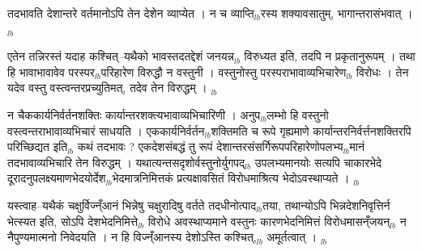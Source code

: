 \documentclass[article,12pt,a4paper]{memoir}%
\newcounter{parCount}
\begin{document}
	  
	  \pstart \leavevmode%
	तदभावति देशान्तरे वर्तमानोऽपि तेन देशेन व्याप्येत । न च व्याप्ति{\tiny $_{lb}$}रस्य शक्यावसातुम्, भागान्तरासंभवात् ।
	{}
	\pend%
      {\tiny $_{lb}$}

	  
	  \pstart \leavevmode%
	एतेन तन्निरस्तं यदाह कश्चित्--यथैको भावस्तदतद्देशं जनयन्न{\tiny $_{lb}$} विरुध्यत इति, तदपि न प्रकृतानुरूपम् । तथा हि भावाभावावेव परस्पर{\tiny $_{lb}$}परिहारेण विरुद्धौ न वस्तुनी । वस्तुनोस्तु परस्पराभावाव्यभिचारेण{\tiny $_{lb}$} विरोधः । तेन यदेव वस्तु वस्त्वन्तरप्रच्युतिमत्, तदेव तेन विरुद्धम् ।
	{}
	\pend%
      {\tiny $_{lb}$}

	  
	  \pstart \leavevmode%
	न चैककार्यनिर्वर्तनशक्तिः कार्यान्तरशक्त्यभावाव्यभिचारिणी । अनुप{\tiny $_{lb}$}लम्भो हि वस्तुनो वस्त्वन्तराभावाव्यभिचारं साधयति । एककार्यनिर्वर्तन{\tiny $_{lb}$}शक्तिमति च रूपे गृह्यमाणे कार्यान्तरनिर्वर्त्तनशक्तिरपि परिच्छिद्यत इति{\tiny $_{lb}$} कथं तदभावः ? एकदेशसंबद्धं तु रूपं देशान्तरसंसर्गिरूपपरिहारेणोपलभ्य{\tiny $_{lb}$}मानं तदभावाव्यभिचारि तेन विरुद्धम् । यथात्यन्तसदृशोर्वस्तुनोर्युगपद्{\tiny $_{lb}$} \leavevmode{} उपलभ्यमानयोः सत्यपि चाकारभेदे दूरादनुपलक्ष्यमाणभेदयोर्देश{\tiny $_{lb}$}भेदमात्रनिमित्तकं प्रत्यक्षावसितं विरोधमाश्रित्य भेदोऽवस्थाप्यते ।
	{}
	\pend%
      {\tiny $_{lb}$}

	  
	  \pstart \leavevmode%
	यस्त्वाह--यथैकं चक्षुर्विज्न्ँआनं भिन्नेषु चक्षुरादिषु वर्तते तदधीनोत्पाद{\tiny $_{lb}$}तया, तथान्योऽपि भिन्नदेशनिवृत्तिर्न भेत्स्यत इति, सोऽपि देशभेदनिमित्ते{\tiny $_{lb}$} विरोधे अवस्थाप्यमाने वस्तुनः कारणभेदनिमित्तं विरोधमासन्ँजयन्{\tiny $_{lb}$} न नैपुण्यमात्मनो निवेदयति । न हि विज्न्ँआनस्य देशोऽस्ति कश्चित्,{\tiny $_{lb}$} अमूर्तत्वात् ।
	{}
	\pend%
      {\tiny $_{lb}$}
\end{document}
